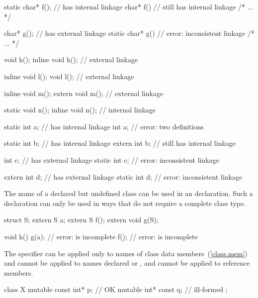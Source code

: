 \begin{codeblock}
static char* f();               //  has internal linkage
char* f()                       //  still has internal linkage
  { /* ... */ }

char* g();                      //  has external linkage
static char* g()                // error: inconsistent linkage
  { /* ... */ }

void h();
inline void h();                // external linkage

inline void l();
void l();                       // external linkage

inline void m();
extern void m();                // external linkage

static void n();
inline void n();                // internal linkage

static int a;                   //  has internal linkage
int a;                          // error: two definitions

static int b;                   //  has internal linkage
extern int b;                   //  still has internal linkage

int c;                          //  has external linkage
static int c;                   // error: inconsistent linkage

extern int d;                   //  has external linkage
static int d;                   // error: inconsistent linkage
\end{codeblock}
\exitexample

\pnum
{}%
The name of a declared but undefined class can be used in an
 declaration. Such a declaration can only be used in ways
that do not require a complete class type.
\enterexample

\begin{codeblock}
struct S;
extern S a;
extern S f();
extern void g(S);

void h() {
  g(a);                         // error:  is incomplete
  f();                          // error:  is incomplete
}
\end{codeblock}
\exitexample

\pnum
The  specifier can be applied only to names of class data
members~(\ref{class.mem}) and cannot be applied to names declared
 or , and cannot be applied to reference
members.
\enterexample

\begin{codeblock}
class X {
  mutable const int* p;         // OK
  mutable int* const q;         // ill-formed
};
\end{codeblock}
\exitexample

